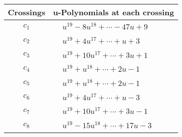 \documentclass[1p]{elsarticle_modified}
\theoremstyle{definition}
\begin{document}
\begin{tabular}{m{50pt}|m{274pt}}
Crossings & \hspace{64pt}u-Polynomials at each crossing \\
\hline $$\begin{aligned}c_{1}\end{aligned}$$&$\begin{aligned}
&u^{19}-8 u^{18}+\cdots-47 u+9
\end{aligned}$\\
\hline $$\begin{aligned}c_{2}\end{aligned}$$&$\begin{aligned}
&u^{19}+4 u^{17}+\cdots+u+3
\end{aligned}$\\
\hline $$\begin{aligned}c_{3}\end{aligned}$$&$\begin{aligned}
&u^{19}+10 u^{17}+\cdots+3 u+1
\end{aligned}$\\
\hline $$\begin{aligned}c_{4}\end{aligned}$$&$\begin{aligned}
&u^{19}+u^{18}+\cdots+2 u-1
\end{aligned}$\\
\hline $$\begin{aligned}c_{5}\end{aligned}$$&$\begin{aligned}
&u^{19}+u^{18}+\cdots+2 u-1
\end{aligned}$\\
\hline $$\begin{aligned}c_{6}\end{aligned}$$&$\begin{aligned}
&u^{19}+4 u^{17}+\cdots+u-3
\end{aligned}$\\
\hline $$\begin{aligned}c_{7}\end{aligned}$$&$\begin{aligned}
&u^{19}+10 u^{17}+\cdots+3 u-1
\end{aligned}$\\
\hline $$\begin{aligned}c_{8}\end{aligned}$$&$\begin{aligned}
&u^{19}-15 u^{18}+\cdots+17 u-3
\end{aligned}$\\

\end{tabular}
\end{document}
